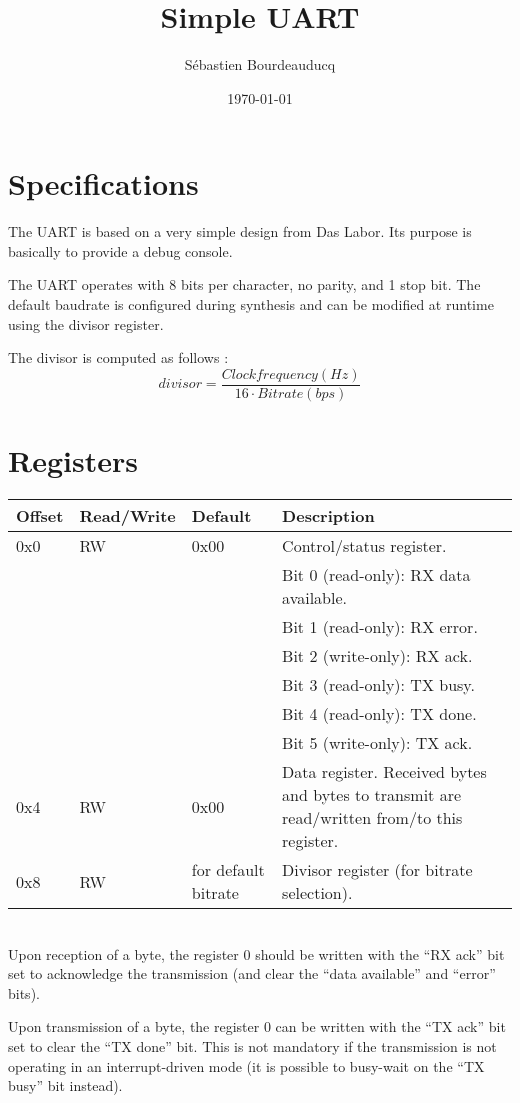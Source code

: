 \documentclass[a4paper,11pt]{article}
\title{Simple UART}
\author{S\'ebastien Bourdeauducq}
\date{\today}
\begin{document}
\maketitle{}
\section{Specifications}
The UART is based on a very simple design from Das Labor. Its purpose is basically to provide a debug console.

The UART operates with 8 bits per character, no parity, and 1 stop bit. The default baudrate is configured during synthesis and can be modified at runtime using the divisor register.

The divisor is computed as follows :
\begin{equation*}
divisor = \frac{Clock frequency (Hz)}{16 \cdot Bitrate (bps)}
\end{equation*}

\section{Registers}

\begin{tabular}{|l|l|l|p{8cm}|}
\hline
\bf{Offset} & \bf{Read/Write} & \bf{Default} & \bf{Description} \\
\hline
0x0 & RW & 0x00 & Control/status register.\\
& & & Bit 0 (read-only): RX data available.\\
& & & Bit 1 (read-only): RX error.\\
& & & Bit 2 (write-only): RX ack.\\
& & & Bit 3 (read-only): TX busy.\\
& & & Bit 4 (read-only): TX done.\\
& & & Bit 5 (write-only): TX ack. \\
\hline
0x4 & RW & 0x00 & Data register. Received bytes and bytes to transmit are read/written from/to this register. \\
\hline
0x8 & RW & for default bitrate & Divisor register (for bitrate selection). \\
\hline
\end{tabular}\\

Upon reception of a byte, the register 0 should be written with the ``RX ack'' bit set to acknowledge the transmission (and clear the ``data available'' and ``error'' bits).

Upon transmission of a byte, the register 0 can be written with the ``TX ack'' bit set to clear the ``TX done'' bit. This is not mandatory if the transmission is not operating in an interrupt-driven mode (it is possible to busy-wait on the ``TX busy'' bit instead).
\end{document}
